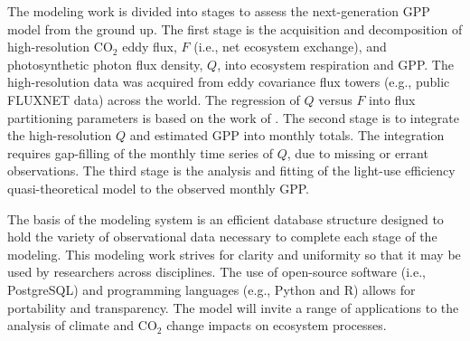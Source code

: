 The modeling work is divided into stages to assess the next-generation GPP model from the ground up.
The first stage is the acquisition and decomposition of high-resolution CO$_2$ eddy flux, $F$ (i.e., net ecosystem exchange), and photosynthetic photon flux density, $Q$, into ecosystem respiration and GPP.
The high-resolution data was acquired from eddy covariance flux towers (e.g., public FLUXNET data) across the world.
The regression of $Q$ versus $F$ into flux partitioning parameters is based on the work of \cite{ruimy95}.
The second stage is to integrate the high-resolution $Q$ and estimated GPP into monthly totals.
The integration requires gap-filling of the monthly time series of $Q$, due to missing or errant observations.
The third stage is the analysis and fitting of the light-use efficiency quasi-theoretical model to the observed monthly GPP.
 
The basis of the modeling system is an efficient database structure designed to hold the variety of observational data necessary to complete each stage of the modeling.  
This modeling work strives for clarity and uniformity so that it may be used by researchers across disciplines.  
The use of open-source software (i.e., PostgreSQL) and programming languages (e.g., Python and R) allows for portability and transparency.  
The model will invite a range of applications to the analysis of climate and CO$_{2}$ change impacts on ecosystem processes.
